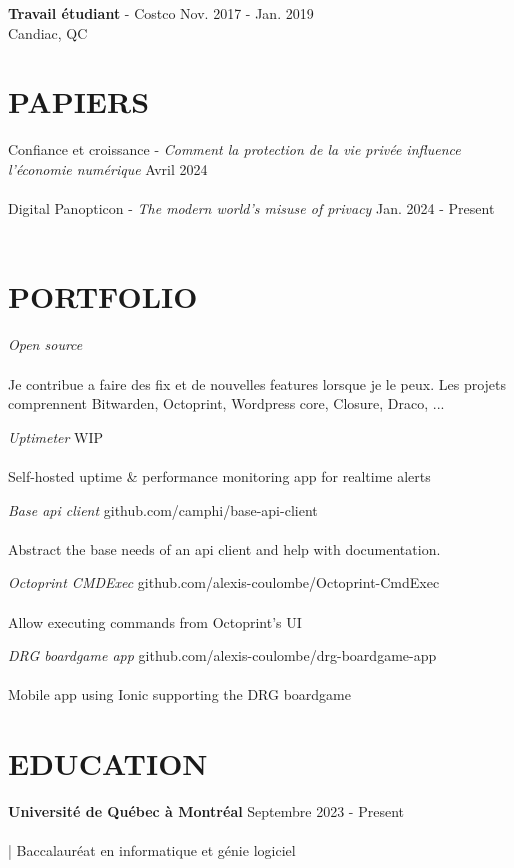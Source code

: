 \documentclass[margin, 10pt]{res} %
\begin{document}
\begin{resume}
{\textbf{Travail étudiant} - Costco} \hfill Nov. 2017 - Jan. 2019 \\
Candiac, QC

\section{PAPIERS}

{Confiance et croissance - \sl Comment la protection de la vie privée influence l'économie numérique} \hfill Avril 2024 \\\\
{Digital Panopticon - \sl The modern world's misuse of privacy} \hfill Jan. 2024 - Present \\\\

\section{PORTFOLIO}

{\sl Open source} \hfill \\\\
Je contribue a faire des fix et de nouvelles features lorsque je le peux. Les projets comprennent Bitwarden, Octoprint, Wordpress core, Closure, Draco, ...

{\sl Uptimeter} \hfill WIP \\\\
Self-hosted uptime \& performance monitoring app for realtime alerts 

{\sl Base api client} \hfill github.com/camphi/base-api-client \\\\
Abstract the base needs of an api client and help with documentation.

{\sl Octoprint CMDExec} \hfill github.com/alexis-coulombe/Octoprint-CmdExec \\\\
Allow executing commands from Octoprint's UI

{\sl DRG boardgame app} \hfill github.com/alexis-coulombe/drg-boardgame-app \\\\
Mobile app using Ionic supporting the DRG boardgame 

\section{EDUCATION}

{\textbf{Université de Québec à Montréal}} \hfill Septembre 2023 - Present \\\\
| Baccalauréat en informatique et génie logiciel \\


\end{resume}
\end{document}
